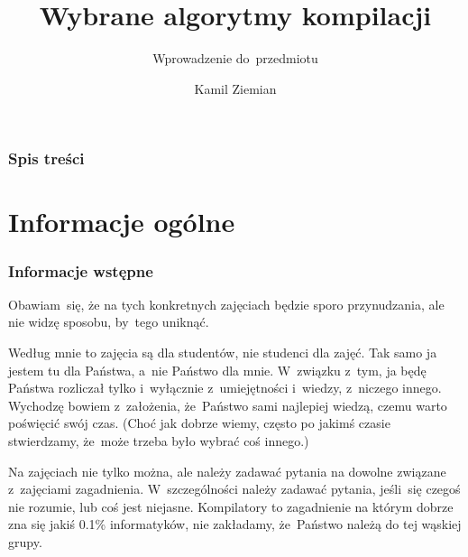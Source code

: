 \documentclass[10pt,t]{beamer}
\title{Wybrane algorytmy kompilacji}
\subtitle{Wprowadzenie do~przedmiotu}
\author{Kamil Ziemian \\
  \email}
\begin{document}





\RaggedRight





\maketitle





\begin{frame}
  \frametitle{Spis treści}


  \tableofcontents

\end{frame}





\section{Informacje ogólne}





\begin{frame}
  \frametitle{Informacje wstępne}


  Obawiam~się, że na tych konkretnych zajęciach będzie sporo przynudzania,
  ale nie widzę sposobu, by~tego uniknąć.

  Według mnie to zajęcia są dla studentów, nie studenci dla zajęć. Tak samo
  ja jestem tu dla Państwa, a~nie Państwo dla mnie. W~związku z~tym, ja
  będę Państwa rozliczał tylko i~wyłącznie z~umiejętności i~wiedzy,
  z~niczego innego. Wychodzę bowiem z~założenia, że~Państwo sami najlepiej
  wiedzą, czemu warto poświęcić swój czas. (Choć jak dobrze wiemy, często
  po jakimś czasie stwierdzamy, że~może trzeba było wybrać coś innego.)

  Na zajęciach nie tylko można, ale \alert{należy} zadawać pytania
  na dowolne związane z~zajęciami zagadnienia. W~szczególności
  \alert{należy} zadawać pytania, jeśli~się czegoś nie rozumie, lub coś
  jest niejasne. Kompilatory to zagadnienie na którym dobrze zna się jakiś
  0.1\% informatyków, \alert{nie} zakładamy, że~Państwo należą do tej
  wąskiej grupy.

\end{frame}
\end{document}
